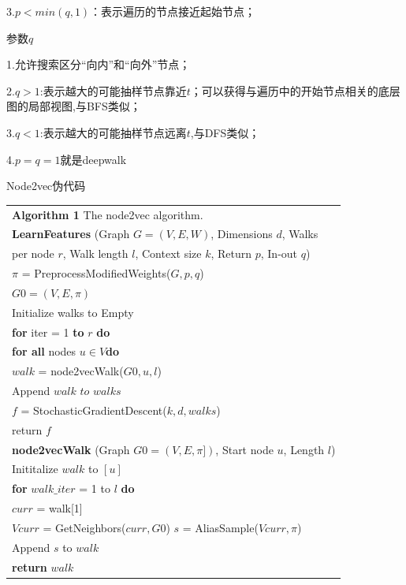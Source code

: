 3.$p < min(q, 1)$：表示遍历的节点接近起始节点；

参数$q$

1.允许搜索区分“向内”和“向外”节点；

2.$q>1$:表示越大的可能抽样节点靠近$t$；可以获得与遍历中的开始节点相关的底层图的局部视图,与BFS类似；

3.$q<1$:表示越大的可能抽样节点远离$t$,与DFS类似；

4.$p=q=1$就是deepwalk


Node2vec伪代码

\begin{tabular}{l}
	\hline
	
	\textbf{Algorithm 1} The node2vec algorithm.\\
	
	\textbf{LearnFeatures} (Graph $G = (V, E, W)$, Dimensions $d$, Walks \\per node $r$, Walk length $l$, Context size $k$, Return $p$, In-out $q$)\\
	
	$\pi$ = PreprocessModifiedWeights($G, p, q$)\\
	
	$G0 = (V, E, π)$\\
	
	Initialize walks to Empty\\
	
	\textbf{for} iter = 1 \textbf{to} $r$ \textbf{do}\\
	
	\quad \textbf{for all} nodes $u \in V $\textbf{do}\\
	
	\quad\quad $walk$ = node2vecWalk($G0, u, l$)\\
	
	\quad\quad Append $walk$ $to$ $walks$\\
	
	$f$ = StochasticGradientDescent($k, d, walks$)\\
	
	return $f$\\
	\hline 
	
	\textbf{node2vecWalk} (Graph $G0 = (V, E, \pi])$, Start node $u$, Length $l$)\\
	
	Inititalize $walk$ to $[u]$	\\
	
	\textbf{for} $walk\_iter$ = 1 to $l$ \textbf{do}	\\
	
	\quad$curr$ = walk[1]	\\
	
	\quad$Vcurr$ = GetNeighbors($curr, G0$) $s$ = AliasSample($Vcurr, \pi$)\\
	
	\quad Append $s$ to $walk$	\\
	
	\textbf{return} $walk$	\\
	\hline   
	
\end{tabular}


